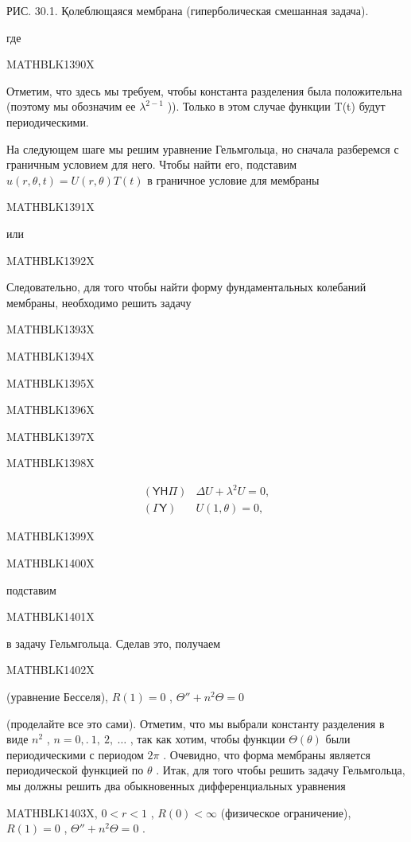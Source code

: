 \documentclass[
]{article}
\begin{document}
РИС. 30.1. Қолеблющаяся мембрана (гиперболическая смешанная задача).

где

MATHBLK1390X

Отметим, что здесь мы требуем, чтобы константа разделения была
положительна (поэтому мы обозначим ее \(\lambda^{2-1}\) )). Только в
этом случае функции T(t) будут периодическими.

На следующем шаге мы решим уравнение Гельмгольца, но сначала разберемся
с граничным условием для него. Чтобы найти его, подставим
\(u(r, \theta, t) = U(r, \theta) T(t)\) в граничное условие для мембраны

MATHBLK1391X

или

MATHBLK1392X

Следовательно, для того чтобы найти форму фундаментальных колебаний
мембраны, необходимо решить задачу

MATHBLK1393X

MATHBLK1394X

MATHBLK1395X

MATHBLK1396X

MATHBLK1397X

MATHBLK1398X

\[
\begin{aligned} (\mathsf{Y}\mathsf{H}\mathsf{\Pi}) & \Delta U + \lambda^2 U = 0, \\ (\mathsf{\Gamma}\mathsf{Y}) & U(1, \theta) = 0, \end{aligned}
\]

MATHBLK1399X

MATHBLK1400X

подставим

MATHBLK1401X

в задачу Гельмгольца. Сделав это, получаем

MATHBLK1402X

(уравнение Бесселя), \(R(1) = 0\) , \(\Theta'' + n^2\Theta = 0\)

(проделайте все это сами). Отметим, что мы выбрали константу разделения
в виде \(n^2\) , \(n=0,. \ 1,\ 2,\ \ldots\) , так как хотим, чтобы
функции \(\Theta\left(\theta\right)\) были периодическими с периодом
\(2\pi\) . Очевидно, что форма мембраны является периодической функцией
по \(\theta\) . Итак, для того чтобы решить задачу Гельмгольца, мы
должны решить два обыкновенных дифференциальных уравнения

MATHBLK1403X, \(0 < r < 1\) , \(R(0) < \infty\) (физическое
ограничение), \(R(1) = 0\) , \(\Theta'' + n^2\Theta = 0\) .
\end{document}
